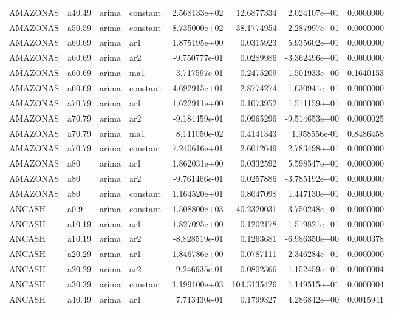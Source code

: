 \documentclass[
]{article}
\begin{document}
\begin{table}[!h]
\begin{tabular}[t]{llllrrrr}
AMAZONAS & a40.49 & arima & constant & 2.568133e+02 & 12.6877334 & 2.024107e+01 & 0.0000000\\
AMAZONAS & a50.59 & arima & constant & 8.735000e+02 & 38.1774954 & 2.287997e+01 & 0.0000000\\
AMAZONAS & a60.69 & arima & ar1 & 1.875195e+00 & 0.0315923 & 5.935602e+01 & 0.0000000\\
\addlinespace
AMAZONAS & a60.69 & arima & ar2 & -9.750777e-01 & 0.0289986 & -3.362496e+01 & 0.0000000\\
AMAZONAS & a60.69 & arima & ma1 & 3.717597e-01 & 0.2475209 & 1.501933e+00 & 0.1640153\\
AMAZONAS & a60.69 & arima & constant & 4.692915e+01 & 2.8774274 & 1.630941e+01 & 0.0000000\\
AMAZONAS & a70.79 & arima & ar1 & 1.622911e+00 & 0.1073952 & 1.511159e+01 & 0.0000000\\
AMAZONAS & a70.79 & arima & ar2 & -9.184459e-01 & 0.0965296 & -9.514653e+00 & 0.0000025\\
\addlinespace
AMAZONAS & a70.79 & arima & ma1 & 8.111050e-02 & 0.4141343 & 1.958556e-01 & 0.8486458\\
AMAZONAS & a70.79 & arima & constant & 7.240616e+01 & 2.6012649 & 2.783498e+01 & 0.0000000\\
AMAZONAS & a80 & arima & ar1 & 1.862031e+00 & 0.0332592 & 5.598547e+01 & 0.0000000\\
AMAZONAS & a80 & arima & ar2 & -9.761466e-01 & 0.0257886 & -3.785192e+01 & 0.0000000\\
AMAZONAS & a80 & arima & constant & 1.164520e+01 & 0.8047098 & 1.447130e+01 & 0.0000000\\
\addlinespace
ANCASH & a0.9 & arima & constant & -1.508800e+03 & 40.2320031 & -3.750248e+01 & 0.0000000\\
ANCASH & a10.19 & arima & ar1 & 1.827095e+00 & 0.1202178 & 1.519821e+01 & 0.0000000\\
ANCASH & a10.19 & arima & ar2 & -8.828519e-01 & 0.1263681 & -6.986350e+00 & 0.0000378\\
ANCASH & a20.29 & arima & ar1 & 1.846786e+00 & 0.0787111 & 2.346284e+01 & 0.0000000\\
ANCASH & a20.29 & arima & ar2 & -9.246935e-01 & 0.0802366 & -1.152459e+01 & 0.0000004\\
\addlinespace
ANCASH & a30.39 & arima & constant & 1.199100e+03 & 104.3135426 & 1.149515e+01 & 0.0000004\\
ANCASH & a40.49 & arima & ar1 & 7.713430e-01 & 0.1799327 & 4.286842e+00 & 0.0015941\\

\end{tabular}
\end{table}
\end{document}
